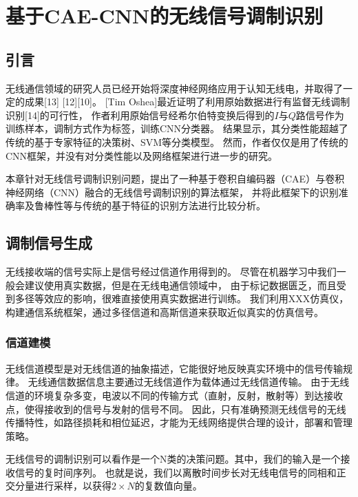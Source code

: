\chapter{基于CAE-CNN的无线信号调制识别}

\section{引言}

无线通信领域的研究人员已经开始将深度神经网络应用于认知无线电，并取得了一定的成果[13] [12][10]。
[Tim Oshea]最近证明了利用原始数据进行有监督无线调制识别[14]的可行性，
作者利用原始信号经希尔伯特变换后得到的$I$与$Q$路信号作为训练样本，调制方式作为标签，训练CNN分类器。
结果显示，其分类性能超越了传统的基于专家特征的决策树、SVM等分类模型。
然而，作者仅仅是用了传统的CNN框架，并没有对分类性能以及网络框架进行进一步的研究。\par

本章针对无线信号调制识别问题，提出了一种基于卷积自编码器（CAE）与卷积神经网络（CNN）融合的无线信号调制识别的算法框架，
并将此框架下的识别准确率及鲁棒性等与传统的基于特征的识别方法进行比较分析。\par


\section{调制信号生成}

无线接收端的信号实际上是信号经过信道作用得到的。
尽管在机器学习中我们一般会建议使用真实数据，但是在无线电通信领域中，
由于标记数据匮乏，而且受到多径等效应的影响，很难直接使用真实数据进行训练。
我们利用XXX仿真仪，构建通信系统框架，通过多径信道和高斯信道来获取近似真实的仿真信号。\par


\subsection{信道建模}

无线信道模型是对无线信道的抽象描述，它能很好地反映真实环境中的信号传输规律。
无线通信数据信息主要通过无线信道作为载体通过无线信道传输。 
由于无线信道的环境复杂多变，电波以不同的传输方式（直射，反射，散射等）到达接收点，使得接收到的信号与发射的信号不同。
因此，只有准确预测无线信号的无线传播特性，如路径损耗和相位延迟，才能为无线网络提供合理的设计，部署和管理策略。\par

无线信号的调制识别可以看作是一个N类的决策问题。其中，我们的输入是一个接收信号的复时间序列。
也就是说，我们以离散时间步长对无线电信号的同相和正交分量进行采样，以获得$2 \times N$的复数值向量。\par

